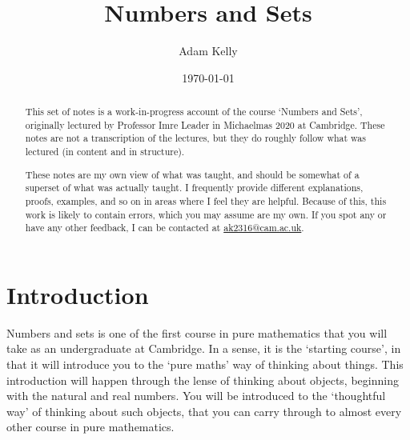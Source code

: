 \documentclass[a4paper]{scrreprt}
\title{Numbers and Sets}
\author{Adam Kelly}
\date{\today}
\begin{document}
\maketitle

\begin{abstract}
	

	This set of notes is a work-in-progress account of the course `Numbers and Sets', originally lectured by Professor Imre Leader in Michaelmas 2020 at Cambridge. These notes are not a transcription of the lectures, but they do roughly follow what was lectured (in content and in structure).

	These notes are my own view of what was taught, and should be somewhat of a superset of what was actually taught. I frequently provide different explanations, proofs, examples, and so on in areas where I feel they are helpful. Because of this, this work is likely to contain errors, which you may assume are my own. If you spot any or have any other feedback, I can be contacted at \href{mailto:ak2316@cam.ac.uk}{ak2316@cam.ac.uk}.



\end{abstract}

\tableofcontents

\clearpage
\chapter{Introduction}

Numbers and sets is one of the first course in pure mathematics that you will take
as an undergraduate at Cambridge. In a sense, it is the `starting course', in that it will introduce you to the `pure maths' way of thinking about things. 
This introduction will happen through the lense of thinking about objects, beginning with the natural and real numbers. You will be introduced to the `thoughtful way' of thinking about such objects, that you can carry through to almost every other course in pure mathematics.
\end{document}
